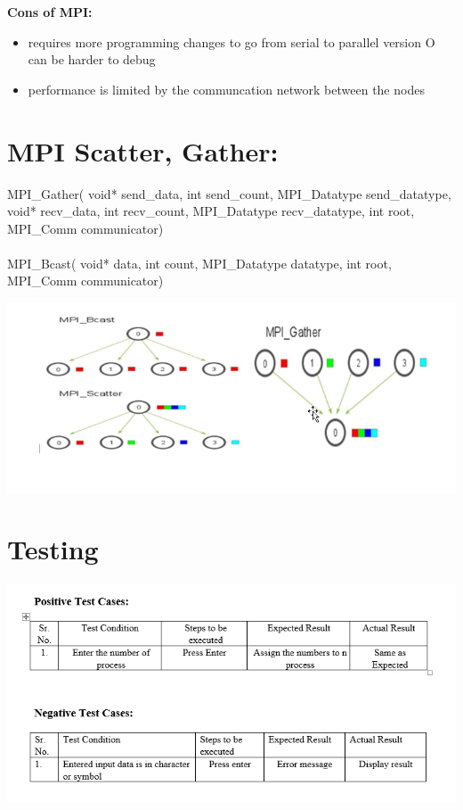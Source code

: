 \documentclass[a4paper,12pt]{article}
\begin{document}
\textbf{Cons of MPI:}  
\begin{itemize}
	\item requires more programming changes to go from serial to parallel version O can be harder to debug 
	\item  performance is limited by the communcation network between the nodes 
	
\end{itemize}

\newpage

\section{MPI Scatter, Gather:} 

MPI\_Gather( void* send\_data, int send\_count,  MPI\_Datatype send\_datatype, void* recv\_data, int recv\_count, MPI\_Datatype recv\_datatype,  	int root, MPI\_Comm communicator) \\ \\
MPI\_Bcast( void* data,  int count,  MPI\_Datatype datatype,  int root, MPI\_Comm communicator)

\includegraphics[scale=0.75]{MPI_06}

\section{Testing}
\includegraphics[scale=0.75]{MPI_07}
\end{document}
